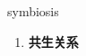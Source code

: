 
\begin{frame}
{\huge symbiosis}
\begin{center}
\begin{enumerate}\Large
  \item \textbf{共生关系}
\end{enumerate}
\end{center}
\end{frame}
